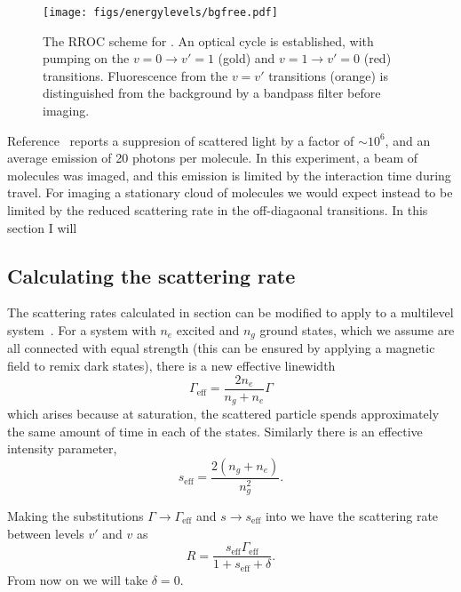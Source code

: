 \begin{figure}
  \centering
  \texttt{[image: figs/energylevels/bgfree.pdf]}
  \caption{
  The RROC scheme for \CaF{}. An optical cycle is established, with pumping on
  the $v=0 \rightarrow v'=1$ (gold) and $v=1 \rightarrow v'=0$ (red) transitions.
  Fluorescence from the $v=v'$ transitions (orange) is distinguished from the
  background by a bandpass filter before imaging.
  }
  \label{exper:fig:bgfreelevels}
\end{figure}

Reference~\cite{Shaw2021} reports a suppresion of scattered light by a factor
of $\sim10^6$, and an average emission of 20 photons per molecule. In this
experiment, a beam of molecules was imaged, and this emission is limited by the
interaction time during travel. For imaging a stationary cloud of molecules we
would expect instead to be limited by the reduced scattering rate in the
off-diagaonal transitions. In this section I will 

\subsection{Calculating the scattering rate}

The scattering rates calculated in section  can be modified to
apply to a multilevel system~\cite{Metcalf1999}. For a system with $n_e$
excited and $n_g$ ground states, which we assume are all connected with equal
strength (this can be ensured by applying a magnetic field to remix dark
states), there is a new effective linewidth~\cite{}
%
\begin{equation}
  \Gamma_\text{eff} = \frac{2n_e}{n_g + n_e}\Gamma
\end{equation}
%
which arises because at saturation, the scattered particle spends approximately
the same amount of time in each of the states. Similarly there is an effective
intensity parameter,
%
\begin{equation}
  s_\text{eff} = \frac{2(n_g + n_e)}{n_g^2}.
\end{equation}
%

Making the substitutions $\Gamma\rightarrow\Gamma_\text{eff}$ and $s\rightarrow
s_\text{eff}$ into  we have the scattering rate between
levels $v'$ and $v$ as
%
\begin{equation}
  R = \frac{s_\text{eff}\Gamma_\text{eff}}{1 + s_\text{eff} + \delta}.
\end{equation}
%
From now on we will take $\delta = 0$.

